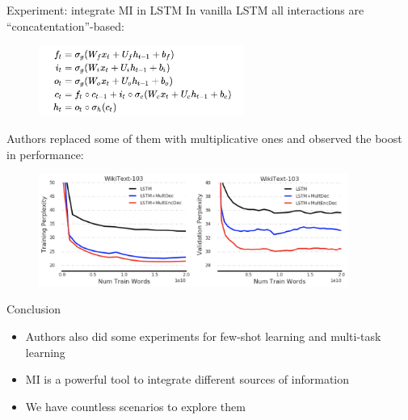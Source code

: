 \documentclass[10pt]{beamer}
\begin{document}
\begin{frame}{Experiment: integrate MI in LSTM}
    \pause In vanilla LSTM all interactions are ``concatentation''-based:
    \begin{figure}
        \centering
        \includegraphics[width=0.6\textwidth]{images/lstm-equations.png}
    \end{figure}
    Authors replaced some of them with multiplicative ones and observed the boost in performance:
    \begin{figure}
        \centering
        \includegraphics[width=0.9\textwidth]{images/mi-in-lm.png}
    \end{figure}
\end{frame}

\begin{frame}{Conclusion}
    \begin{itemize}
        \item Authors also did some experiments for few-shot learning and multi-task learning
        \item MI is a powerful tool to integrate different sources of information
        \item We have countless scenarios to explore them
    \end{itemize}
\end{frame}
\end{document}
